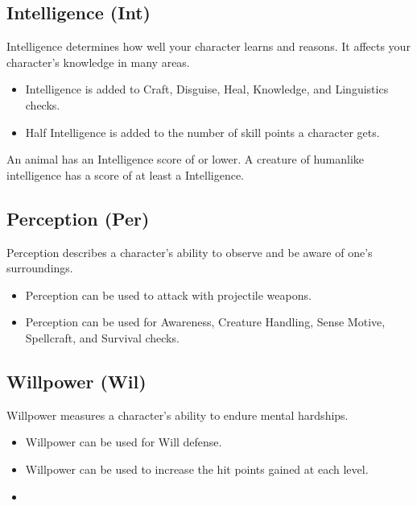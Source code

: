 \subsection{Intelligence (Int)}
Intelligence determines how well your character learns and reasons. It affects your character's knowledge in many areas.

\begin{itemize}
    \item Intelligence is added to Craft, Disguise, Heal, Knowledge, and Linguistics checks.
    \item Half Intelligence is added to the number of skill points a character gets.
\end{itemize}

\par An animal has an Intelligence score of  or lower. A creature of humanlike intelligence has a score of at least a  Intelligence.

\subsection{Perception (Per)}
Perception describes a character's ability to observe and be aware of one's surroundings.
\begin{itemize}
    \item Perception can be used to attack with projectile weapons.
    \item Perception can be used for Awareness, Creature Handling, Sense Motive, Spellcraft, and Survival checks.
\end{itemize}

\subsection{Willpower (Wil)}
Willpower measures a character's ability to endure mental hardships.
\begin{itemize}
    \item Willpower can be used for Will defense.
    \item Willpower can be used to increase the hit points gained at each level.
    \item 
\end{itemize}

